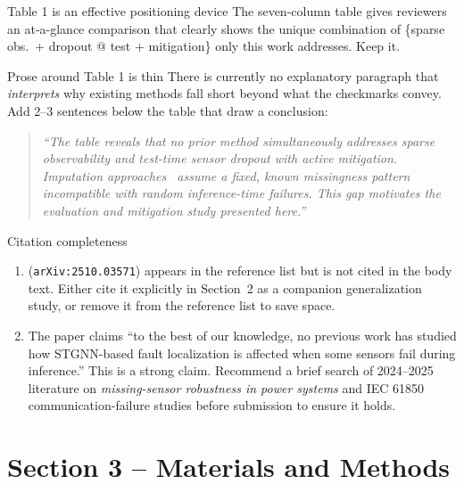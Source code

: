 \documentclass[11pt,a4paper]{article}
\begin{document}
\begin{okbox}{Table 1 is an effective positioning device}
The seven-column table gives reviewers an at-a-glance comparison that clearly
shows the unique combination of \{sparse obs.\ + dropout @ test + mitigation\}
only this work addresses. Keep it.
\end{okbox}

\begin{warnbox}{Prose around Table 1 is thin}
There is currently no explanatory paragraph that \emph{interprets} why existing
methods fall short beyond what the checkmarks convey. Add 2--3 sentences
below the table that draw a conclusion:
\begin{quote}
\textit{``The table reveals that no prior method simultaneously addresses sparse
observability and test-time sensor dropout with active mitigation. Imputation
approaches~\cite{Zhang2025,Fan2024} assume a fixed, known missingness pattern
incompatible with random inference-time failures. This gap motivates the
evaluation and mitigation study presented here.''}
\end{quote}
\end{warnbox}

\begin{suggestbox}{Citation completeness}
\begin{enumerate}[leftmargin=*,label=\arabic*.]
  \item \cite{Karabulut2025} (\texttt{arXiv:2510.03571}) appears in the
    reference list but is not cited in the body text. Either cite it
    explicitly in Section~2 as a companion generalization study, or remove it
    from the reference list to save space.
  \item The paper claims ``to the best of our knowledge, no previous work has
    studied how STGNN-based fault localization is affected when some sensors
    fail during inference.'' This is a strong claim. Recommend a brief
    search of 2024--2025 literature on \textit{missing-sensor robustness in
    power systems} and IEC 61850 communication-failure studies before
    submission to ensure it holds.
\end{enumerate}
\end{suggestbox}

\section{Section 3 -- Materials and Methods}
\end{document}
